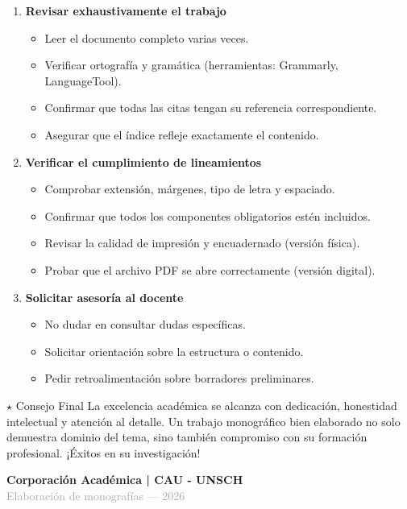 \documentclass[12pt,a4paper]{article}
\begin{document}
\begin{enumerate}
  \item \textbf{Revisar exhaustivamente el trabajo}
  \begin{itemize}
    \item Leer el documento completo varias veces.
    \item Verificar ortografía y gramática (herramientas: Grammarly, LanguageTool).
    \item Confirmar que todas las citas tengan su referencia correspondiente.
    \item Asegurar que el índice refleje exactamente el contenido.
  \end{itemize}
  
  \item \textbf{Verificar el cumplimiento de lineamientos}
  \begin{itemize}
    \item Comprobar extensión, márgenes, tipo de letra y espaciado.
    \item Confirmar que todos los componentes obligatorios estén incluidos.
    \item Revisar la calidad de impresión y encuadernado (versión física).
    \item Probar que el archivo PDF se abre correctamente (versión digital).
  \end{itemize}
  
  \item \textbf{Solicitar asesoría al docente}
  \begin{itemize}
    \item No dudar en consultar dudas específicas.
    \item Solicitar orientación sobre la estructura o contenido.
    \item Pedir retroalimentación sobre borradores preliminares.
  \end{itemize}
\end{enumerate}

\begin{infobox}{$\star$ Consejo Final}
  La excelencia académica se alcanza con dedicación, honestidad intelectual y atención al detalle. Un trabajo monográfico bien elaborado no solo demuestra dominio del tema, sino también compromiso con su formación profesional. ¡Éxitos en su investigación!
\end{infobox}

\vspace{1cm}

\begin{center}
  
  \vspace{0.5cm}
  
  \textcolor{primaryblue}{\Large\textbf{Corporación Académica | CAU - UNSCH}}\\
  \textcolor{darkgray}{Elaboración de monografías --- 2026}
\end{center}
\end{document}

